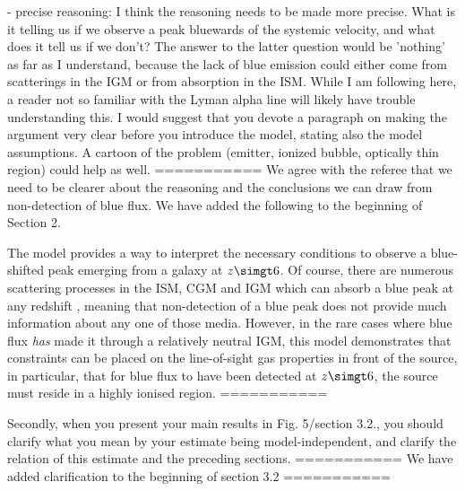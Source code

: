 - precise reasoning:
I think the reasoning needs to be made more precise. What is it telling us if we observe a peak bluewards of the systemic velocity, and what does it tell us if we don't? The answer to the latter question would be 'nothing' as far as I understand, because the lack of blue emission could either come from scatterings in the IGM or from absorption in the ISM. While I am following here, a reader not so familiar with the Lyman alpha line will likely have trouble understanding this. I would suggest that you devote a paragraph on making the argument very clear before you introduce the model, stating also the model assumptions. A cartoon of the problem (emitter, ionized bubble, optically thin region) could help as well.
===========
We agree with the referee that we need to be clearer about the reasoning and the conclusions we can draw from non-detection of blue flux. We have added the following to the beginning of Section 2.

The model provides a way to interpret the necessary conditions to observe a blue-shifted \lya peak emerging from a galaxy at $z\simgt6$. Of course, there are numerous scattering processes in the ISM, CGM and IGM which can absorb a blue peak at any redshift \citep[e.g.,][]{Gunn1965,Zheng2010,Laursen2011}, meaning that non-detection of a blue peak does not provide much information about any one of those media. However, in the rare cases where blue \lya flux \textit{has} made it through a relatively neutral IGM, this model demonstrates that constraints can be placed on the line-of-sight gas properties in front of the source, in particular, that for blue flux to have been detected at $z\simgt6$, the source must reside in a highly ionised region.
===========

Secondly, when you present your main results in Fig. 5/section 3.2., you should clarify what you mean by your estimate being model-independent, and clarify the relation of this estimate and the preceding sections.
===========
We have added clarification to the beginning of section 3.2
===========


